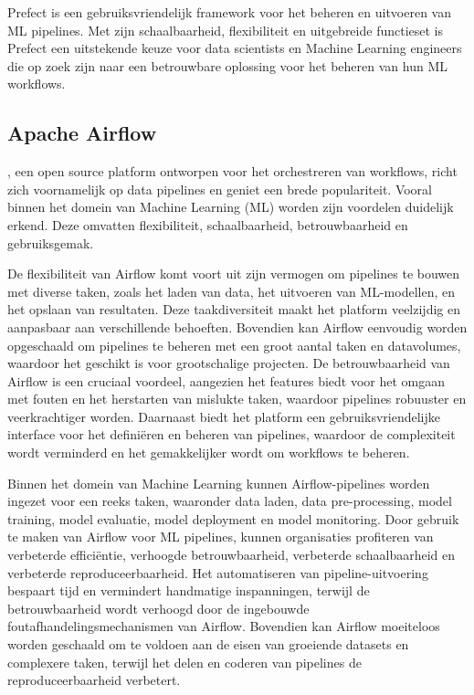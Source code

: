 Prefect is een gebruiksvriendelijk framework voor het beheren en uitvoeren van ML pipelines. Met zijn schaalbaarheid, flexibiliteit en uitgebreide functieset is Prefect een uitstekende keuze voor data scientists en Machine Learning engineers die op zoek zijn naar een betrouwbare oplossing voor het beheren van hun ML workflows.
\subsection{Apache Airflow}

\textcite{ApacheAirflow2024}, een open source platform ontworpen voor het orchestreren van workflows, richt zich voornamelijk op data pipelines en geniet een brede populariteit. Vooral binnen het domein van Machine Learning (ML) worden zijn voordelen duidelijk erkend. Deze omvatten flexibiliteit, schaalbaarheid, betrouwbaarheid en gebruiksgemak.

De flexibiliteit van Airflow komt voort uit zijn vermogen om pipelines te bouwen met diverse taken, zoals het laden van data, het uitvoeren van ML-modellen, en het opslaan van resultaten. Deze taakdiversiteit maakt het platform veelzijdig en aanpasbaar aan verschillende behoeften. Bovendien kan Airflow eenvoudig worden opgeschaald om pipelines te beheren met een groot aantal taken en datavolumes, waardoor het geschikt is voor grootschalige projecten. De betrouwbaarheid van Airflow is een cruciaal voordeel, aangezien het features biedt voor het omgaan met fouten en het herstarten van mislukte taken, waardoor pipelines robuuster en veerkrachtiger worden. Daarnaast biedt het platform een gebruiksvriendelijke interface voor het definiëren en beheren van pipelines, waardoor de complexiteit wordt verminderd en het gemakkelijker wordt om workflows te beheren.

Binnen het domein van Machine Learning kunnen Airflow-pipelines worden ingezet voor een reeks taken, waaronder data laden, data pre-processing, model training, model evaluatie, model deployment en model monitoring. Door gebruik te maken van Airflow voor ML pipelines, kunnen organisaties profiteren van verbeterde efficiëntie, verhoogde betrouwbaarheid, verbeterde schaalbaarheid en verbeterde reproduceerbaarheid. Het automatiseren van pipeline-uitvoering bespaart tijd en vermindert handmatige inspanningen, terwijl de betrouwbaarheid wordt verhoogd door de ingebouwde foutafhandelingsmechanismen van Airflow. Bovendien kan Airflow moeiteloos worden geschaald om te voldoen aan de eisen van groeiende datasets en complexere taken, terwijl het delen en coderen van pipelines de reproduceerbaarheid verbetert.


